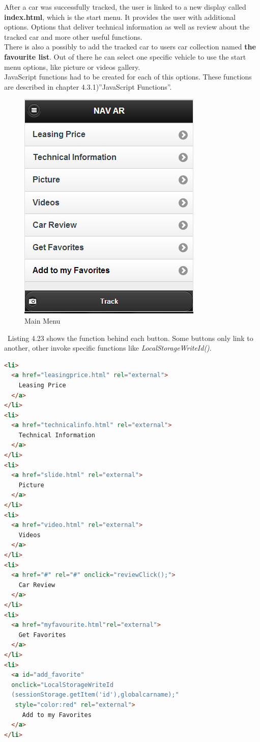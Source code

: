 After a car was successfully tracked, the user is linked to a new display called \textbf{index.html}, which is the start menu. It provides the user with additional options. Options that deliver technical information as well as review about the tracked car and more other useful functions. 
\\

There is also a possibly to add the tracked car to users car collection named \textbf{the favourite list}. Out of there he can select one specific vehicle to use the start menu options, like picture or videos gallery.
\\

JavaScript functions had to be created for each  of this options. These functions are described in chapter 4.3.1)''JavaScript Functions''.
\\

\begin{figure}[h]
\centering
\includegraphics[width=0.5\linewidth]{graphics/chapter4/3}
\caption{Main Menu}
\end{figure}
\newpage


\
Listing 4.23 shows the function behind each button. Some buttons only link to another, other invoke specific functions like \textit{LocalStorageWriteId()}.\\
\begin{lstlisting}[language=html, caption= 
Main menu source code,captionpos=b]	
<li>
  <a href="leasingprice.html" rel="external">
    Leasing Price
  </a>
</li>
<li>
  <a href="technicalinfo.html" rel="external">
    Technical Information
  </a>
</li>
<li>
  <a href="slide.html" rel="external">
    Picture
  </a>
</li>
<li>
  <a href="video.html" rel="external">
    Videos
  </a>
</li>
<li>
  <a href="#" rel="#" onclick="reviewClick();">
    Car Review
  </a>
</li>
<li>
  <a href="myfavourite.html"rel="external">
    Get Favorites
  </a>
</li>
<li>
  <a id="add_favorite" 
  onclick="LocalStorageWriteId
  (sessionStorage.getItem('id'),globalcarname);"
   style="color:red" rel="external">
     Add to my Favorites
  </a>
</li>
\end{lstlisting}
\newpage


